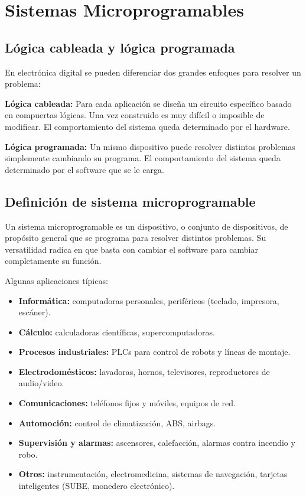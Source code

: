 \chapter{Sistemas Microprogramables}

\section{Lógica cableada y lógica programada}

En electrónica digital se pueden diferenciar dos grandes enfoques para resolver un problema:

\textbf{Lógica cableada:} Para cada aplicación se diseña un circuito específico basado en compuertas lógicas. Una vez construido es muy difícil o imposible de modificar. El comportamiento del sistema queda determinado por el hardware.

\textbf{Lógica programada:} Un mismo dispositivo puede resolver distintos problemas simplemente cambiando su programa. El comportamiento del sistema queda determinado por el software que se le carga.

\section{Definición de sistema microprogramable}

Un sistema microprogramable es un dispositivo, o conjunto de dispositivos, de propósito general que se programa para resolver distintos problemas. Su versatilidad radica en que basta con cambiar el software para cambiar completamente su función.

Algunas aplicaciones típicas:

\begin{itemize}
  \item \textbf{Informática:} computadoras personales, periféricos (teclado, impresora, escáner).
  \item \textbf{Cálculo:} calculadoras científicas, supercomputadoras.
  \item \textbf{Procesos industriales:} PLCs para control de robots y líneas de montaje.
  \item \textbf{Electrodomésticos:} lavadoras, hornos, televisores, reproductores de audio/video.
  \item \textbf{Comunicaciones:} teléfonos fijos y móviles, equipos de red.
  \item \textbf{Automoción:} control de climatización, ABS, airbags.
  \item \textbf{Supervisión y alarmas:} ascensores, calefacción, alarmas contra incendio y robo.
  \item \textbf{Otros:} instrumentación, electromedicina, sistemas de navegación, tarjetas inteligentes (SUBE, monedero electrónico).
\end{itemize}


